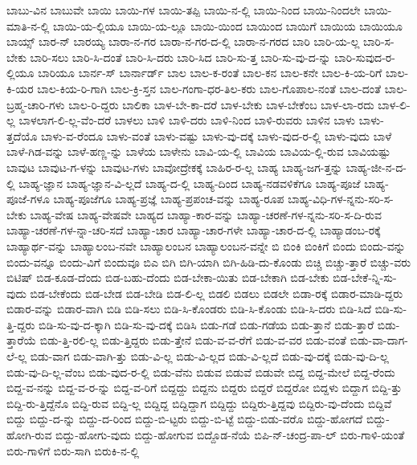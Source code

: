 {ಬಾಬು-ವಿನ
ಬಾಬುವೇ
ಬಾಯಿ
ಬಾಯಿ-ಗಳ
ಬಾಯಿ-ತಪ್ಪಿ
ಬಾಯಿ-ನ-ಲ್ಲಿ
ಬಾಯಿ-ನಿಂದ
ಬಾಯಿ-ನಿಂದಲೇ
ಬಾಯಿ-ಮಾತಿ-ನ-ಲ್ಲಿ
ಬಾಯಿ-ಯ-ಲ್ಲಿಯೂ
ಬಾಯಿ-ಯ-ಲ್ಲೂ
ಬಾಯಿ-ಯಿಂದ
ಬಾಯಿಂದ
ಬಾಯಿಗೆ
ಬಾಯಿಯ
ಬಾಯಿಯೂ
ಬಾಯ್ಸ್
ಬಾರ-ನ್
ಬಾರಯ್ಯ
ಬಾರಾ-ನ-ಗರ
ಬಾರಾ-ನ-ಗರ-ದ-ಲ್ಲಿ
ಬಾರಾ-ನ-ಗರದ
ಬಾರಿ
ಬಾರಿ-ಯ-ಲ್ಲ
ಬಾರಿ-ಸ-ಬೇಕು
ಬಾರಿ-ಸಲು
ಬಾರಿ-ಸಿ-ದಂತೆ
ಬಾರಿ-ಸಿ-ದರು
ಬಾರಿ-ಸಿದ
ಬಾರಿ-ಸು-ತ್ತ
ಬಾರಿ-ಸು-ವು-ದ-ನ್ನು
ಬಾರಿ-ಸುವುದ-ರ-ಲ್ಲಿಯೂ
ಬಾರಿಯೂ
ಬಾರ್ನ-ಸ್
ಬಾರ್ನಾರ್ಡ್
ಬಾಲ
ಬಾಲ-ಕ-ರಂತೆ
ಬಾಲ-ಕನ
ಬಾಲ-ಕನೇ
ಬಾಲ-ಕಿ-ಯ-ರಿಗೆ
ಬಾಲ-ಕಿ-ಯರ
ಬಾಲ-ಕಿಯ-ರಿ-ಗಾಗಿ
ಬಾಲ-ಕ್ರಿ-ಸ್ತನ
ಬಾಲ-ಗಂಗಾ-ಧರ-ತಿಲ-ಕರು
ಬಾಲ-ಗೊಪಾಲ-ನಂತೆ
ಬಾಲ-ದಂತೆ
ಬಾಲ-ಬ್ರಹ್ಮ-ಚಾರಿ-ಗಳು
ಬಾಲ-ರಿ-ದ್ದರು
ಬಾಲಿಕಾ
ಬಾಳ-ಬೇ-ಕಾ-ದರೆ
ಬಾಳ-ಬೇಕು
ಬಾಳ-ಬೇಕೆಂಬ
ಬಾಳ-ಲಾ-ರದು
ಬಾಳ-ಲಿ-ಲ್ಲ
ಬಾಳಲಾಗ-ಲಿ-ಲ್ಲ-ವೆಂ-ದರೆ
ಬಾಳಲು
ಬಾಳಿ
ಬಾಳಿ-ದರು
ಬಾಳಿ-ನಿಂದ
ಬಾಳಿ-ರುವರು
ಬಾಳಿನ
ಬಾಳು
ಬಾಳು-ತ್ತದೆಯೊ
ಬಾಳು-ವ-ರೆಂದೂ
ಬಾಳು-ವಂತೆ
ಬಾಳು-ವಷ್ಟು
ಬಾಳು-ವು-ದಕ್ಕೆ
ಬಾಳು-ವುದ-ರ-ಲ್ಲಿ
ಬಾಳು-ವುದು
ಬಾಳೆ
ಬಾಳೆ-ಗಿಡ-ವನ್ನು
ಬಾಳೆ-ಹಣ್ಣ-ನ್ನು
ಬಾಳೆಯ
ಬಾಳೇನು
ಬಾವಿ-ಯ-ಲ್ಲಿ
ಬಾವಿಯ
ಬಾವಿಯ-ಲ್ಲಿ-ರುವ
ಬಾವಿಯಷ್ಟು
ಬಾವುಟ
ಬಾವುಟ-ಗ-ಳನ್ನು
ಬಾವುಟ-ಗಳು
ಬಾವೋದ್ರೇಕಕ್ಕೆ
ಬಾಹಿರ-ರ-ಲ್ಲ
ಬಾಹ್ಯ
ಬಾಹ್ಯ-ಜಗ-ತ್ತನ್ನು
ಬಾಹ್ಯ-ಜೀ-ನ-ದ-ಲ್ಲಿ
ಬಾಹ್ಯ-ಜ್ಞಾನ
ಬಾಹ್ಯ-ಜ್ಞಾನ-ವಿ-ಲ್ಲದೆ
ಬಾಹ್ಯ-ದ-ಲ್ಲಿ
ಬಾಹ್ಯ-ದಿಂದ
ಬಾಹ್ಯ-ನಡವಳಿಕೆಗೂ
ಬಾಹ್ಯ-ಪೂಜೆ
ಬಾಹ್ಯ-ಪೂಜೆ-ಗಳೂ
ಬಾಹ್ಯ-ಪೂಜೆಗೂ
ಬಾಹ್ಯ-ಪ್ರಜ್ಞೆ
ಬಾಹ್ಯ-ಪ್ರಪಂಚ-ವನ್ನು
ಬಾಹ್ಯ-ರೂಪ
ಬಾಹ್ಯ-ವಿಧಿ-ಗಳ-ನ್ನನು-ಸರಿ-ಸ-ಬೇಕು
ಬಾಹ್ಯ-ವೇಷ
ಬಾಹ್ಯ-ವೇಷವೇ
ಬಾಹ್ಯದ
ಬಾಹ್ಯಾ-ಕಾರ-ವನ್ನು
ಬಾಹ್ಯಾ-ಚರಣೆ-ಗಳ-ನ್ನನು-ಸರಿ-ಸ-ದಿ-ರುವ
ಬಾಹ್ಯಾ-ಚರಣೆ-ಗಳ-ನ್ನಾ-ಚರಿ-ಸದೆ
ಬಾಹ್ಯಾ-ಚಾರ
ಬಾಹ್ಯಾ-ಚಾರ-ಗಳೇ
ಬಾಹ್ಯಾ-ಚಾರ-ದ-ಲ್ಲಿ
ಬಾಹ್ಯಾಡಂಬ-ರಕ್ಕೆ
ಬಾಹ್ಯಾರ್ಥ-ವನ್ನು
ಬಾಹ್ಯಾಲಂಬ-ನವೇ
ಬಾಹ್ಯಾಲಂಬನ
ಬಾಹ್ಯಾಲಂಬನ-ವನ್ನೇ
ಬಿ
ಬಿಂಕಿ
ಬಿಂಕಿಗೆ
ಬಿಂದು
ಬಿಂದು-ವನ್ನು
ಬಿಂದು-ವನ್ನೂ
ಬಿಂದು-ವಿಗೆ
ಬಿಂದುವೂ
ಬಿಎ
ಬಿಗಿ
ಬಿಗಿ-ಯಾಗಿ
ಬಿಗಿ-ಹಿಡಿ-ದು-ಕೊಂಡು
ಬಿಚ್ಚಿ
ಬಿಚ್ಚು-ತ್ತಾರೆ
ಬಿಚ್ಚು-ವರು
ಬಿಟಿಷ್
ಬಿಡ-ಕೂಡ-ದೆಂದು
ಬಿಡ-ಬಹು-ದೆಂದು
ಬಿಡ-ಬೇಕಾ-ಯಿತು
ಬಿಡ-ಬೇಕಾಗಿ
ಬಿಡ-ಬೇಕು
ಬಿಡ-ಬೇಕೆ-ನ್ನಿ-ಸು-ವುದು
ಬಿಡ-ಬೇಕೆಂದು
ಬಿಡ-ಬೇಡ
ಬಿಡ-ಬೇಡಿ
ಬಿಡ-ಲಿ-ಲ್ಲ
ಬಿಡಲಿ
ಬಿಡಲು
ಬಿಡಲೇ
ಬಿಡಾ-ರಕ್ಕೆ
ಬಿಡಾರ-ಮಾಡಿ-ದ್ದರು
ಬಿಡಾರ-ವನ್ನು
ಬಿಡಾರ-ವಾಗಿ
ಬಿಡಿ
ಬಿಡಿ-ಸಲು
ಬಿಡಿ-ಸಿ-ಕೊಂಡರು
ಬಿಡಿ-ಸಿ-ಕೊಂಡು
ಬಿಡಿ-ಸಿ-ದರು
ಬಿಡಿ-ಸಿದೆ
ಬಿಡಿ-ಸು-ತ್ತಿ-ದ್ದರು
ಬಿಡಿ-ಸು-ವು-ದ-ಕ್ಕಾಗಿ
ಬಿಡಿ-ಸು-ವು-ದಕ್ಕೆ
ಬಿಡಿಸಿ
ಬಿಡು-ಗಡೆ
ಬಿಡು-ಗಡೆಯ
ಬಿಡು-ತ್ತಾನೆ
ಬಿಡು-ತ್ತಾರೆ
ಬಿಡು-ತ್ತಾರೆಯೆ
ಬಿಡು-ತ್ತಿ-ರಲಿ-ಲ್ಲ
ಬಿಡು-ತ್ತಿದ್ದರು
ಬಿಡು-ತ್ತೇನೆ
ಬಿಡು-ವ-ವ-ರೆಗೆ
ಬಿಡು-ವ-ವರ
ಬಿಡು-ವಂತೆ
ಬಿಡು-ವಾ-ದಾಗ-ಲೆ-ಲ್ಲ
ಬಿಡು-ವಾಗ
ಬಿಡು-ವಾಗಿ-ತ್ತು
ಬಿಡು-ವಿ-ಲ್ಲ
ಬಿಡು-ವಿ-ಲ್ಲದ
ಬಿಡು-ವಿ-ಲ್ಲದೆ
ಬಿಡು-ವು-ದಕ್ಕೆ
ಬಿಡು-ವು-ದಿ-ಲ್ಲ
ಬಿಡು-ವು-ದಿ-ಲ್ಲ-ವೆಂಬ
ಬಿಡು-ವುದ-ರ-ಲ್ಲಿ
ಬಿಡು-ವೆನು
ಬಿಡುವ
ಬಿಡುವೆ
ಬಿಡುವೇ
ಬಿದ್ದ
ಬಿದ್ದ-ಮೇಲೆ
ಬಿದ್ದ-ರೆಂದು
ಬಿದ್ದ-ವ-ನನ್ನು
ಬಿದ್ದ-ವ-ರ-ನ್ನು
ಬಿದ್ದ-ವ-ರಿಗೆ
ಬಿದ್ದದ್ದು
ಬಿದ್ದನು
ಬಿದ್ದರು
ಬಿದ್ದರೆ
ಬಿದ್ದರೋ
ಬಿದ್ದಳು
ಬಿದ್ದಾಗ
ಬಿದ್ದಿ-ತ್ತು
ಬಿದ್ದಿ-ರು-ತ್ತಿದ್ದೆನೊ
ಬಿದ್ದಿ-ರುವ
ಬಿದ್ದಿ-ಲ್ಲ
ಬಿದ್ದಿದ್ದ
ಬಿದ್ದಿದ್ದಾಗ
ಬಿದ್ದಿದ್ದು
ಬಿದ್ದಿರು-ತ್ತಿದ್ದವು
ಬಿದ್ದಿರು-ವು-ದೆಂದು
ಬಿದ್ದಿವೆ
ಬಿದ್ದು
ಬಿದ್ದು-ದ-ನ್ನು
ಬಿದ್ದು-ದ-ರಿಂದ
ಬಿದ್ದು-ಬಿ-ಟ್ಟರು
ಬಿದ್ದು-ಬಿ-ಟ್ಟೆ
ಬಿದ್ದು-ಬಿಡು-ವರೊ
ಬಿದ್ದು-ಹೋಗದೆ
ಬಿದ್ದು-ಹೋಗಿ-ರುವ
ಬಿದ್ದು-ಹೋಗು-ವುದು
ಬಿದ್ದು-ಹೋಗುವ
ಬಿದ್ದೊಡ-ನೆಯೆ
ಬಿಪಿ-ನ್-ಚಂದ್ರ-ಪಾ-ಲ್
ಬಿರು-ಗಾಳಿ-ಯಂತೆ
ಬಿರು-ಗಾಳಿಗೆ
ಬಿರು-ಸಾಗಿ
ಬಿರುಕಿ-ನ-ಲ್ಲಿ
}

